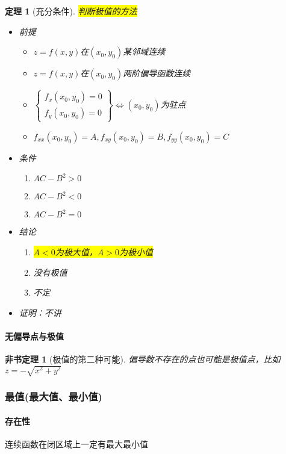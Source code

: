 \documentclass[UTF8,a4paper,12pt,scheme=chinese]{ctexbook}
\newcommand{\hl}[1]{\colorbox{yellow}{#1}}
\newtheorem{theorem}{定理}[section]
\newtheorem*{theorem*}{非书定理}
\theoremstyle{plain}
\begin{document}
	\begin{theorem}[充分条件]
		\hl{判断极值的方法}
		\begin{itemize}
			\item 前提
			\begin{itemize}
				\item $ z=f(x,y) $在$ (x_0,y_0) $某邻域连续
				\item $ z=f(x,y) $在$ (x_0,y_0) $两阶偏导函数连续
				\item $ \left\{\begin{array}{c}
				f_x(x_0,y_0)=0 \\ 
				f_y(x_0,y_0)=0
				\end{array}\right\}  \Leftrightarrow(x_0,y_0)$为驻点
				\item $ f_{xx}(x_0,y_0)=A,f_{xy}(x_0,y_0)=B,f_{yy}(x_0,y_0)=C $
			\end{itemize}
			\item 条件
			\begin{enumerate}
				\item $ AC-B^2>0 $
				\item $ AC-B^2<0 $
				\item $ AC-B^2=0 $
			\end{enumerate}
			\item 结论
			\begin{enumerate}
				\item \hl{$ A<0 $为极大值，$ A>0 $为极小值}
				\item 没有极值
				\item 不定
			\end{enumerate}
			\item 证明：不讲
		\end{itemize}
	\end{theorem}
	\paragraph{无偏导点与极值}
	\begin{theorem*}[极值的第二种可能]
		偏导数不存在的点也可能是极值点，比如
		$ z=-\sqrt{x^2+y^2} $
	\end{theorem*}
	\subsubsection{最值(最大值、最小值)}
	\paragraph{存在性}连续函数在闭区域上一定有最大最小值
\end{document}
